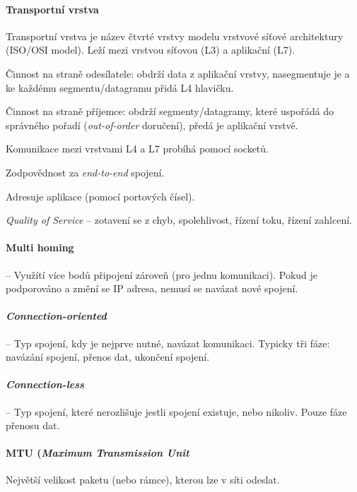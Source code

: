 \paragraph*{Transportní vrstva} Transportní vrstva je název čtvrté vrstvy modelu vrstvové síťové architektury (ISO/OSI model). Leží mezi vrstvou síťovou (L3) a aplikační (L7). \begin{compactitem}
    \item Činnost na straně odesílatele: obdrží data z aplikační vrstvy, nasegmentuje je a ke každému segmentu/datagramu přidá L4 hlavičku.
    \item Činnost na straně příjemce: obdrží segmenty/datagramy, které uspořádá do správného pořadí (\textit{out-of-order} doručení), předá je aplikační vrstvě.
    \item Komunikace mezi vrstvami L4 a L7 probíhá pomocí socketů.
    \item Zodpovědnost za \textit{end-to-end} spojení.
    \item Adresuje aplikace (pomocí portových čísel).
    \item \textit{Quality of Service} -- zotavení se z chyb, spolehlivost, řízení toku, řízení zahlcení.
\end{compactitem}

\paragraph*{Multi homing} -- Využítí více bodů připojení zároveň (pro jednu komunikaci). Pokud je podporováno a změní se IP adresa, nemusí se navázat nové spojení.

\paragraph*{\textit{Connection-oriented}} -- Typ spojení, kdy je nejprve nutné, navázat komunikaci. Typicky tři fáze: navázání spojení, přenos dat, ukončení spojení.

\paragraph*{\textit{Connection-less}} -- Typ spojení, které nerozlišuje jestli spojení existuje, nebo nikoliv. Pouze fáze přenosu dat.

\paragraph*{MTU (\textit{Maximum Transmission Unit}} Největší velikost paketu (nebo rámce), kterou lze v síti odeslat.

